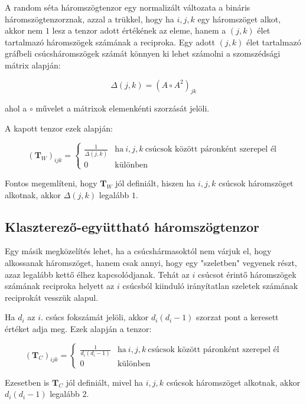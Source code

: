 \documentclass[12pt,numbers=noenddot]{report}
\begin{document}
A random séta háromszögtenzor egy normalizált változata a bináris 
háromszögtenzorznak, azzal a trükkel, hogy ha $i, j, k$ egy háromszöget alkot,
akkor nem $1$ lesz a tenzor adott értékének az eleme, hanem a $(j,k)$ élet
tartalmazó háromszögek számának a reciproka.
Egy adott $(j,k)$ élet tartalmazó gráfbeli csúcsháromszögek számát könnyen ki 
lehet számolni a szomszédsági mátrix alapján:

$$\Delta(j,k) = (A \circ A^2)_{jk}$$

\noindent
ahol a $\circ$ művelet a mátrixok elemenkénti szorzását jelöli.

A kapott tenzor ezek alapján:

\begin{equation}
	(\boldsymbol{T}_W)_{ijk} = 
		\begin{cases}
			\frac{1}{\Delta(j,k)} & \text{ha} ~ i, j, k ~ \text{csúcsok között páronként szerepel él} \\
			0 & \text{különben}
		\end{cases}
\end{equation}

Fontos megemlíteni, hogy $\boldsymbol{T}_W$ jól definiált, hiszen ha 
$i, j, k$ csúcsok háromszöget alkotnak, akkor $\Delta(j,k)$ legalább $1$.


\subsection*{Klaszterező-együttható háromszögtenzor}

Egy másik megközelítés lehet, ha a csúcshármasoktól nem várjuk el, hogy 
alkossanak háromszöget, hanem csak annyi, hogy egy "szeletben" vegyenek részt,
azaz legalább kettő élhez kapcsolódjanak.
Tehát az $i$ csúcsot érintő háromszögek számának reciproka helyett az $i$ 
csúcsból kiinduló irányítatlan szeletek számának reciprokát vesszük alapul.

Ha $d_i$ az $i.$ csúcs fokszámát jelöli, akkor $d_i(d_i-1)$ szorzat pont a 
keresett értéket adja meg. Ezek alapján a tenzor:

\begin{equation}
	(\boldsymbol{T}_C)_{ijk} = 
		\begin{cases}
			\frac{1}{d_i(d_i-1)} & \text{ha} ~ i, j, k ~ \text{csúcsok között páronként szerepel él} \\
			0 & \text{különben}
		\end{cases}
\end{equation}

Ezesetben is $\boldsymbol{T}_C$ jól definiált, mivel ha 
$i, j, k$ csúcsok háromszöget alkotnak, akkor $d_i(d_i-1)$ legalább $2$.
\end{document}
